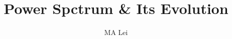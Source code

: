 \documentclass{article}
\begin{document}
\title{Power Spctrum \& Its Evolution}
\author{MA Lei}
\maketitle






















\end{document}
